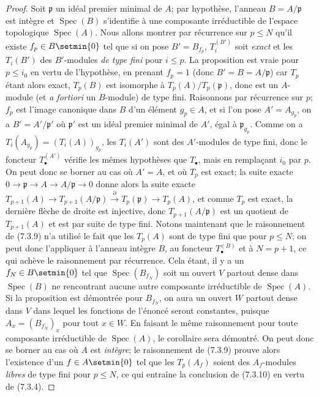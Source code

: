 \begin{proof}
Soit $\mathfrak p$ un idéal premier minimal de $A$; par hypothèse, l'anneau
$B=A/\mathfrak p$ est intègre et $\operatorname{Spec}(B)$ s'identifie à une
composante irréductible de l'espace topologique $\operatorname{Spec}(A)$. Nous
allons montrer par récurrence sur $p\leq N$ qu'il existe
$f_p\in B\setmin\{0\}$ tel que si on pose $B'=B_{f_p}$, $T_i^{(B')}$ soit \emph{exact} et
les $T_i(B')$ des $B'$-modules \emph{de type fini} pour $i\leq p$. La proposition est
vraie pour $p\leq i_0$ en vertu de l'hypothèse, en prenant $f_p=1$ (donc
$B'=B=A/\mathfrak p$) car $T_p$ étant alors exact, $T_p(B)$ est isomorphe à
$T_p(A)/T_p(\mathfrak p)$, donc est un $A$-module (et \emph{a fortiori} un
$B$-module) de type fini. Raisonnons par récurrence sur $p$; $f_p$ est l'image
canonique dans $B$ d'un élément $g_p\in A$, et si l'on pose $A'=A_{g_p}$, on a
$B'=A'/\mathfrak p'$ où $\mathfrak p'$ est un idéal premier minimal de $A'$,
égal à $\mathfrak p_{g_p}$. Comme on a
$T_i(A_{g_p})=(T_i(A))_{g_p}$,
les $T_i(A')$ sont des $A'$-modules de type fini, donc le foncteur
$T_\bullet^{(A')}$ vérifie les mêmes hypothèses que $T_\bullet$, mais en
remplaçant $i_0$ par $p$. On peut donc se borner au cas où $A'=A$, et où $T_p$
est exact; la suite exacte
$0\longrightarrow\mathfrak p\longrightarrow A\longrightarrow A/\mathfrak p\longrightarrow0$
donne alors la suite exacte
$T_{p+1}(A)\longrightarrow T_{p+1}(A/\mathfrak p)\xrightarrow{\partial}T_p(\mathfrak p)\longrightarrow T_p(A)$,
et comme $T_p$ est exact, la dernière flèche de droite est injective, donc
$T_{p+1}(A/\mathfrak p)$ est un quotient de $T_{p+1}(A)$ et est par suite de
type fini. Notons maintenant que le raisonnement de (7.3.9) n'a utilisé le fait
que les $T_p(A)$ sont de type fini que pour $p\leq N$; on peut donc l'appliquer
à l'anneau intègre $B$, au foncteur $T_\bullet^{(B)}$ et à $N=p+1$, ce qui
achève le raisonnement par récurrence. Cela étant, il y a un
$f_N\in B\setmin\{0\}$ tel que $\operatorname{Spec}(B_{f_N})$ soit un ouvert $V$
partout dense dans $\operatorname{Spec}(B)$ ne rencontrant aucune autre
composante irréductible de $\operatorname{Spec}(A)$. Si la proposition est
démontrée pour $B_{f_N}$, on aura un ouvert $W$ partout dense dans $V$ dans
lequel les fonctions de l'énoncé seront constantes, puisque
$A_x=(B_{f_N})_x$ pour tout $x\in W$. En faisant le même raisonnement pour
toute composante irréductible de $\operatorname{Spec}(A)$, le corollaire sera
démontré. On peut donc se borner au cas où $A$ est \emph{intègre}; le raisonnement de
(7.3.9) prouve alors l'existence d'un $f\in A\setmin\{0\}$ tel que les $T_p(A_f)$
soient des $A_f$-modules \emph{libres} de type fini pour $p\leq N$, ce qui entraîne
la conclusion de (7.3.10) en vertu de (7.3.4).
\end{proof}

